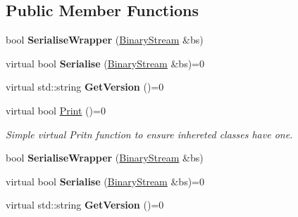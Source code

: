 \subsection*{Public Member Functions}
\begin{DoxyCompactItemize}
\item 
\hypertarget{classSerialisableObject_a3783b1798068a4bdc58fe6cdf7f7929b}{bool {\bfseries Serialise\-Wrapper} (\hyperlink{classBinaryStream}{Binary\-Stream} \&bs)}\label{classSerialisableObject_a3783b1798068a4bdc58fe6cdf7f7929b}

\item 
\hypertarget{classSerialisableObject_ab8916a102bc94764f023b1713fb040db}{virtual bool {\bfseries Serialise} (\hyperlink{classBinaryStream}{Binary\-Stream} \&bs)=0}\label{classSerialisableObject_ab8916a102bc94764f023b1713fb040db}

\item 
\hypertarget{classSerialisableObject_a345b21d2a7c869dedd96ad691fc602bd}{virtual std\-::string {\bfseries Get\-Version} ()=0}\label{classSerialisableObject_a345b21d2a7c869dedd96ad691fc602bd}

\item 
\hypertarget{classSerialisableObject_a9055c98969917d4c652eefdc924b6b75}{virtual bool \hyperlink{classSerialisableObject_a9055c98969917d4c652eefdc924b6b75}{Print} ()=0}\label{classSerialisableObject_a9055c98969917d4c652eefdc924b6b75}

\begin{DoxyCompactList}\small\item\em Simple virtual Pritn function to ensure inhereted classes have one. \end{DoxyCompactList}\item 
\hypertarget{classSerialisableObject_a3783b1798068a4bdc58fe6cdf7f7929b}{bool {\bfseries Serialise\-Wrapper} (\hyperlink{classBinaryStream}{Binary\-Stream} \&bs)}\label{classSerialisableObject_a3783b1798068a4bdc58fe6cdf7f7929b}

\item 
\hypertarget{classSerialisableObject_ab8916a102bc94764f023b1713fb040db}{virtual bool {\bfseries Serialise} (\hyperlink{classBinaryStream}{Binary\-Stream} \&bs)=0}\label{classSerialisableObject_ab8916a102bc94764f023b1713fb040db}

\item 
\hypertarget{classSerialisableObject_a345b21d2a7c869dedd96ad691fc602bd}{virtual std\-::string {\bfseries Get\-Version} ()=0}\label{classSerialisableObject_a345b21d2a7c869dedd96ad691fc602bd}


\end{DoxyCompactItemize}
